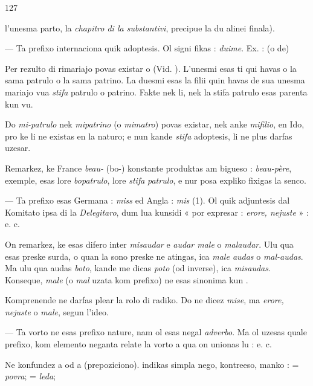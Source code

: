 \begin{VUpage}[131]{127}

\VUcontinue
l'unesma parto, la \textit{chapitro di la substantivi}, precipue la\nl
du alinei finala).

 --- Ta prefixo internaciona quik adoptesis. Ol signi\cc
fikas : \textit{duime}. Ex. : \cc
{}\nl
{} (o de) 

Per rezulto di rimariajo povas existar  o \nl
(Vid. ). L'unesmi esas ti qui havas o la sama patrulo o\nl
la sama patrino. La duesmi esas la filii quin havas de sua\nl
unesma mariajo vua \textit{stifa} patrulo o patrino. Fakte nek li,\nl
nek la stifa patrulo esas parenta kun vu.

Do \textit{mi-patrulo} nek \textit{mipatrino} (o \textit{mimatro}) povas existar,\nl
nek anke \textit{mifilio}, en Ido, pro ke li ne existas en la naturo;\nl
e nun kande \textit{stifa} adoptesis, li ne plus darfas uzesar.

Remarkez, ke France \textit{beau-} (bo-) konstante produktas am\cc
bigueso : \textit{beau-père}, exemple, esas lore \textit{bopatrulo}, lore \textit{stifa}\nl
\textit{patrulo}, e nur posa expliko fixigas la senco.

 --- Ta prefixo esas Germana : \textit{miss} ed Angla : \textit{mis} (1).\nl
Ol quik adjuntesis dal Komitato ipsa di la \textit{Delegitaro}, dum\nl
lua kunsidi « por expresar : \textit{erore, nejuste} » : \nl
{}\cc
{} e. c.

On remarkez, ke esas difero inter \textit{misaudar} e \textit{audar male} o\nl
\textit{malaudar}. Ulu qua esas preske surda, o quan la sono preske ne\nl
atingas, ica \textit{male audas} o \textit{mal-audas}. Ma ulu qua audas \textit{boto},\nl
kande me dicas \textit{poto} (od inverse), ica \textit{misaudas}. Konseque,\nl
\textit{male} (o \textit{mal} uzata kom prefixo) ne esas sinonima kun .\parplein

Komprenende  ne darfas plear la rolo di radiko. Do\nl
ne dicez \textit{mise}, ma \textit{erore, nejuste} o \textit{male}, segun l'ideo.

 --- Ta vorto ne esas prefixo nature, nam ol esas negal\nl
\textit{adverbo}. Ma ol uzesas quale prefixo, kom elemento neganta\nl
relate la vorto a qua on unionas lu : \nl
{}\cc
{} e. c.

Ne konfundez  a  od a  (prepoziciono). \nl
indikas simpla nego,  kontreeso,  manko : \nl
{} = \textit{povra};  = \textit{leda}; \cc
\end{VUpage}


